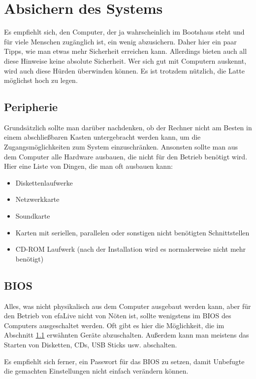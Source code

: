 \documentclass[a4paper,12pt,twoside]{article}
\begin{document}
\section{Absichern des Systems}
\label{sct:system_absichern}
Es empfiehlt sich, den Computer, der
ja wahrscheinlich im Bootshaus steht und für viele Menschen
zugänglich ist, ein wenig abzusichern. Daher hier ein paar Tipps, wie
man etwas mehr Sicherheit erreichen kann. Allerdings bieten auch all
diese Hinweise keine absolute Sicherheit. Wer sich gut mit Computern
auskennt, wird auch diese Hürden überwinden können. Es ist trotzdem
nützlich, die Latte möglichst hoch zu legen.


\subsection{Peripherie}
\label{sct:peripherie}
Grundsätzlich sollte man darüber nachdenken, ob der Rechner nicht am
Besten in einem abschließbaren Kasten untergebracht werden kann, um die 
Zugangsmöglichkeiten zum System einzuschränken. Ansonsten sollte man 
aus dem Computer alle Hardware ausbauen, die
nicht für den Betrieb benötigt wird. Hier eine Liste von Dingen, die
man oft ausbauen kann:

\begin{itemize}
    \item Diskettenlaufwerke
    \item Netzwerkkarte
    \item Soundkarte
    \item Karten mit seriellen, parallelen oder sonstigen nicht benötigten
        Schnittstellen
    \item CD-ROM Laufwerk (nach der Installation wird es normalerweise nicht
        mehr benötigt)
\end{itemize}


\subsection{BIOS}
\label{sct:bios}
Alles, was nicht physikalisch aus dem Computer ausgebaut werden kann,
aber für den Betrieb von efaLive nicht von Nöten ist, sollte wenigstens
im BIOS des Computers ausgeschaltet werden. Oft gibt es hier die
Möglichkeit, die im Abschnitt \ref{sct:peripherie} erwähnten Geräte abzuschalten.
Außerdem kann man meistens das Starten von Disketten, CDs, USB Sticks
usw. abschalten.

Es empfiehlt sich ferner, ein Passwort für das BIOS zu setzen, damit
Unbefugte die gemachten Einstellungen nicht einfach verändern können.
\end{document}
